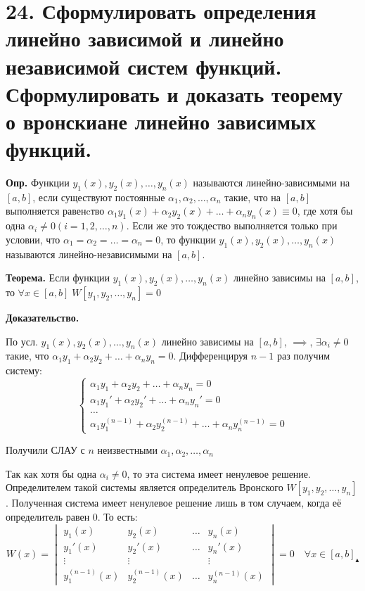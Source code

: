 \documentclass[11pt]{article}
\begin{document}
\section*{24. Сформулировать определения линейно зависимой и линейно независимой систем функций. Сформулировать и доказать теорему о вронскиане линейно зависимых функций.}
\par\textbf{Опр.} Функции $y_{1}(x), y_{2}(x), \dots, y_{n}(x)$ называются линейно-зависимыми на $[a, b]$, если существуют постоянные $\alpha_{1}, \alpha_{2}, \dots, \alpha_{n}$ такие, что на $[a, b]$ выполняется равенcтво $\alpha_{1}y_{1}(x) + \alpha_{2}y_{2}(x) + \dots + \alpha_{n}y_{n}(x) \equiv 0$, где хотя бы одна $\alpha_{i} \neq 0(i = 1, 2, \dots, n)$. Если же это тождество выполняется только при условии, что $\alpha_{1} = \alpha_{2} = \dots = \alpha_{n} = 0$, то функции $y_{1}(x), y_{2}(x), \dots, y_{n}(x)$ называются линейно-независимыми на $[a, b]$.
\par\textbf{Теорема.} Если функции $y_{1}(x), y_{2}(x), \dots, y_{n}(x)$ линейно зависимы на $[a, b]$, то $\forall x \in [a, b] \; W[y_{1}, y_{2}, \dots, y_{n}] = 0$
\par\textbf{Доказательство.}
\par По усл. $y_{1}(x), y_{2}(x), \dots, y_{n}(x)$ линейно зависимы на $[a, b]$, $\implies$, $\exists \alpha_{i} \neq 0$ такие, что $\alpha_{1}y_{1} + \alpha_{2}y_{2} + \dots + \alpha_{n}y_{n} = 0$. Дифференцируя $n-1$ раз получим систему:
$$\left\{\begin{array}{l}
\alpha_{1}y_{1} + \alpha_{2}y_{2} + \dots + \alpha_{n}y_{n} = 0 \\
\alpha_{1}y_{1}' + \alpha_{2}y_{2}' + \dots + \alpha_{n}y_{n}' = 0 \\
\dots \\
\alpha_{1}y_{1}^{(n-1)} + \alpha_{2}y_{2}^{(n-1)} + \dots + \alpha_{n}y_{n}^{(n-1)} = 0
\end{array}\right.$$
\par Получили СЛАУ с $n$ неизвестными $\alpha_{1}, \alpha_{2}, \dots, \alpha_{n}$
\par Так как хотя бы одна $\alpha_{i} \neq 0$, то эта система имеет ненулевое решение. Определителем такой системы является определитель Вронского $W[y_{1}, y_{2}, \dots, y_{n}]$. Полученная система имеет ненулевое решение лишь в том случаем, когда её определитель равен 0. То есть:
$$W(x) = \begin{vmatrix}
y_{1}(x) & y_{2}(x) & \dots & y_{n}(x) \\
y_{1}'(x) & y_{2}'(x) & \dots & y_{n}'(x) \\
\vdots & \vdots & & \vdots \\
y_{1}^{(n-1)}(x) & y_{2}^{(n-1)}(x) & \dots & y_{n}^{(n-1)}(x)
\end{vmatrix} = 0 \quad \forall x \in [a, b] _\blacktriangle$$
\end{document}
